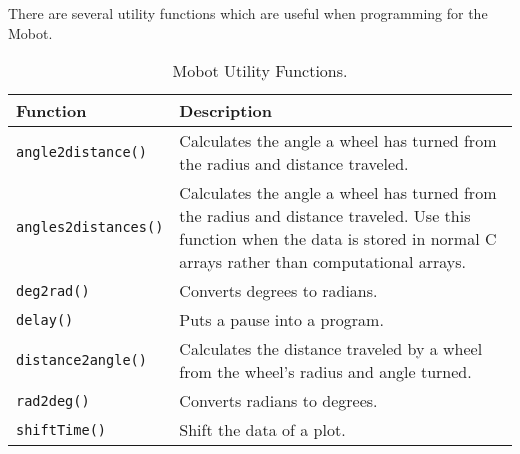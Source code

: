 \noindent
There are several utility functions which are useful when programming for
the Mobot. 

\begin{table}[!h]
\begin{center}
\caption{Mobot Utility Functions.}
\begin{tabular}{p{38 mm}p{110 mm}}
\hline
Function & Description \\
\hline
\texttt{angle2distance()} & Calculates the angle a wheel has turned from the
radius and distance traveled.\\
\texttt{angles2distances()} & Calculates the angle a wheel has turned from the
radius and distance traveled. Use this function when the data is stored in normal C arrays rather than computational arrays.\\
\texttt{deg2rad()} & Converts degrees to radians. \\
\texttt{delay()} & Puts a pause into a program. \\
\texttt{distance2angle()} & Calculates the distance traveled by a wheel from the wheel's radius and angle turned.\\
\texttt{rad2deg()} & Converts radians to degrees.\\
\texttt{shiftTime()} & Shift the data of a plot.\\
\hline
\end{tabular}
\end{center}
\label{mobilec_api_cbinary}
\end{table}

\clearpage
\newpage







